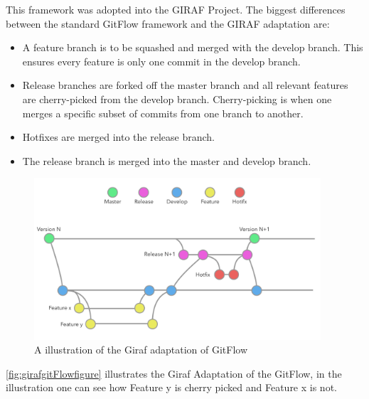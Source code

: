 This framework was adopted into the GIRAF Project\cite{ProcessGitFlow}. The biggest differences between the standard GitFlow framework and the GIRAF adaptation are:

\begin{itemize}
    \item A feature branch is to be squashed and merged with the develop branch. This ensures every feature is only one commit in the develop branch.
    \item Release branches are forked off the master branch and all relevant features are cherry-picked from the develop branch. Cherry-picking is when one merges a specific subset of commits from one branch to another.
    \item Hotfixes are merged into the release branch.
    \item The release branch is merged into the master and develop branch.
\end{itemize}
\begin{figure}[H]
        \begin{center}
            \includegraphics[width=0.95\textwidth]{figures/giraf_gitflow_illustration.pdf}
        \end{center}
        \caption{A illustration of the Giraf adaptation of GitFlow}
        \label{fig:girafgitFlowfigure}
\end{figure}
\autoref{fig:girafgitFlowfigure} illustrates the Giraf Adaptation of the GitFlow, in the illustration one can see how Feature y is cherry picked and Feature x is not.


